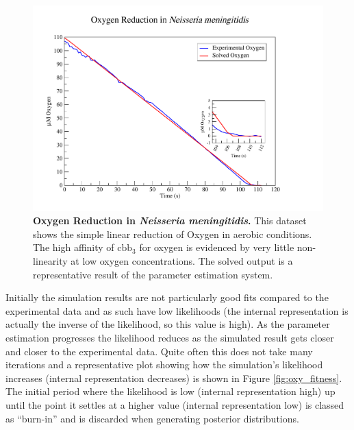 \begin{figure}[tbp]
 \centering
 \includegraphics[width=14cm, trim=2cm 1cm 4cm 1cm]{./05-oxygenreduction/data/o2sim.pdf}
 \caption[{Oxygen Reduction in \textit{Neisseria meningitidis}.}]{{\bf Oxygen Reduction in \textit{Neisseria meningitidis}.} This dataset shows the simple linear reduction of Oxygen in aerobic conditions. The high affinity of $\mathrm{cbb}_3$ for oxygen is evidenced by very little non-linearity at low oxygen concentrations. The solved output is a representative result of the parameter estimation system.
 \label{fig:o2sim}}
\end{figure}

Initially the simulation results are not particularly good fits compared to the experimental data and as such have low likelihoods (the internal representation is actually the inverse of the likelihood, so this value is high). As the parameter estimation progresses the likelihood reduces as the simulated result gets closer and closer to the experimental data. Quite often this does not take many iterations and a representative plot showing how the simulation's likelihood increases (internal representation decreases) is shown in Figure \ref{fig:oxy_fitness}. The initial period where the likelihood is low (internal representation high) up until the point it settles at a higher value (internal representation low) is classed as ``burn-in'' and is discarded when generating posterior distributions.

